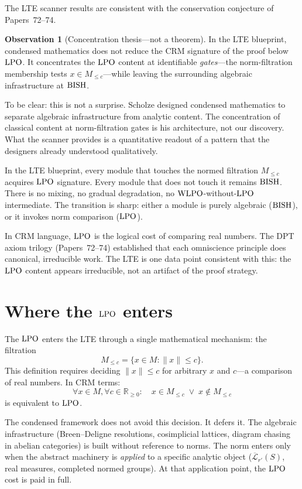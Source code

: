 \documentclass[11pt,a4paper]{article}
\theoremstyle{plain}
\theoremstyle{definition}
\newtheorem{observation}[theorem]{Observation}
\newcommand{\BISH}{\textup{BISH}}
\newcommand{\WLPO}{\textup{WLPO}}
\newcommand{\LPO}{\textup{LPO}}
\newcommand{\R}{\mathbb{R}}
\begin{document}
The LTE scanner results are consistent with the conservation
conjecture of Papers~72--74.

\begin{observation}[Concentration thesis---not a theorem]
In the LTE blueprint, condensed mathematics does not reduce the CRM
signature of the proof below $\LPO$.  It concentrates the $\LPO$
content at identifiable \emph{gates}---the norm-filtration membership
tests $x \in M_{\leq c}$---while leaving the surrounding algebraic
infrastructure at $\BISH$.
\end{observation}

To be clear: this is not a surprise.  Scholze designed condensed
mathematics to separate algebraic infrastructure from analytic
content.  The concentration of classical content at norm-filtration
gates is his architecture, not our discovery.  What the scanner
provides is a quantitative readout of a pattern that the designers
already understood qualitatively.

In the LTE blueprint, every module that touches the normed filtration
$M_{\leq c}$ acquires $\LPO$ signature.  Every module that does not
touch it remains $\BISH$.  There is no mixing, no gradual degradation,
no $\WLPO$-without-$\LPO$ intermediate.  The transition is sharp:
either a module is purely algebraic ($\BISH$), or it invokes norm
comparison ($\LPO$).

In CRM language, $\LPO$ is the logical cost of comparing real numbers.
The DPT axiom trilogy (Papers~72--74) established that each
omniscience principle does canonical, irreducible work.  The LTE is
one data point consistent with this: the $\LPO$ content appears
irreducible, not an artifact of the proof strategy.

\section{Where the $\LPO$ enters}\label{sec:where-lpo}

The $\LPO$ enters the LTE through a single mathematical mechanism:
the filtration
\[
  M_{\leq c} = \{x \in M : \|x\| \leq c\}.
\]
This definition requires deciding $\|x\| \leq c$ for arbitrary $x$
and $c$---a comparison of real numbers.  In CRM terms:
\[
  \forall x \in M, \forall c \in \R_{\geq 0}: \quad
  x \in M_{\leq c} \;\lor\; x \notin M_{\leq c}
\]
is equivalent to $\LPO$.

The condensed framework does not avoid this decision.  It defers it.
The algebraic infrastructure (Breen--Deligne resolutions, cosimplicial
lattices, diagram chasing in abelian categories) is built without
reference to norms.  The norm enters only when the abstract machinery
is \emph{applied} to a specific analytic object ($\overline{\mathcal{L}}_{r'}(S)$,
real measures, completed normed groups).  At that application point,
the $\LPO$ cost is paid in full.
\end{document}
